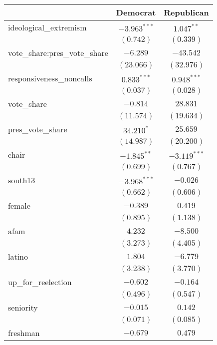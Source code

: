 \documentclass[12pt]{article}
\begin{document}
\begin{table}
	\begin{center}
		\begin{tabular}{l c c }
			\hline
			& Democrat & Republican \\
			\hline
			ideological\_extremism        & $-3.963^{***}$ & $1.047^{**}$   \\
			& $(0.742)$      & $(0.339)$      \\
			vote\_share:pres\_vote\_share & $-6.289$       & $-43.542$      \\
			& $(23.066)$     & $(32.976)$     \\
			responsiveness\_noncalls      & $0.833^{***}$  & $0.948^{***}$  \\
			& $(0.037)$      & $(0.028)$      \\
			vote\_share                   & $-0.814$       & $28.831$       \\
			& $(11.574)$     & $(19.634)$     \\
			pres\_vote\_share             & $34.210^{*}$   & $25.659$       \\
			& $(14.987)$     & $(20.200)$     \\
			chair                         & $-1.845^{**}$  & $-3.119^{***}$ \\
			& $(0.699)$      & $(0.767)$      \\
			south13                       & $-3.968^{***}$ & $-0.026$       \\
			& $(0.662)$      & $(0.606)$      \\
			female                        & $-0.389$       & $0.419$        \\
			& $(0.895)$      & $(1.138)$      \\
			afam                          & $4.232$        & $-8.500$       \\
			& $(3.273)$      & $(4.405)$      \\
			latino                        & $1.804$        & $-6.779$       \\
			& $(3.238)$      & $(3.770)$      \\
			up\_for\_reelection           & $-0.602$       & $-0.164$       \\
			& $(0.496)$      & $(0.547)$      \\
			seniority                     & $-0.015$       & $0.142$        \\
			& $(0.071)$      & $(0.085)$      \\
			freshman                      & $-0.679$       & $0.479$        \\

\end{tabular}
\end{center}
\end{table}
\end{document}
